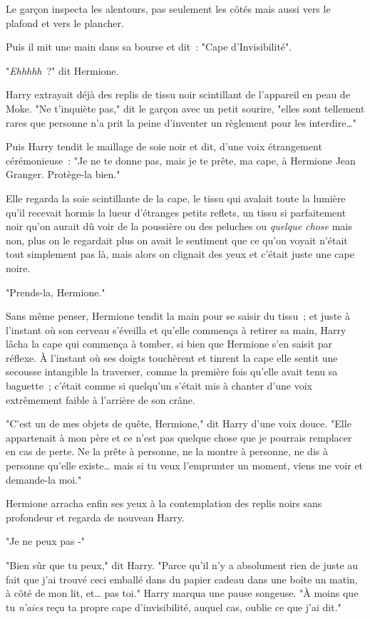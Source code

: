 Le garçon inspecta les alentours, pas seulement les côtés mais aussi vers le plafond et vers le plancher.

Puis il mit une main dans sa bourse et dit~: "Cape d'Invisibilité".

"\emph{Ehhhhh}~?" dit Hermione.

Harry extrayait déjà des replis de tissu noir scintillant de l'appareil en peau de Moke. "Ne t'inquiète pas," dit le garçon avec un petit sourire, "elles sont tellement rares que personne n'a prit la peine d'inventer un règlement pour les interdire…"

Puis Harry tendit le maillage de soie noir et dit, d'une voix étrangement cérémonieuse~: "Je ne te donne pas, mais je te prête, ma cape, à Hermione Jean Granger. Protège-la bien."

Elle regarda la soie scintillante de la cape, le tissu qui avalait toute la lumière qu'il recevait hormis la lueur d'étranges petits reflets, un tissu si parfaitement noir qu'on aurait dû voir de la poussière ou des peluches ou \emph{quelque chose} mais non, plus on le regardait plus on avait le sentiment que ce qu'on voyait n'était tout simplement pas là, mais alors on clignait des yeux et c'était juste une cape noire.

"Prends-la, Hermione."

Sans même penser, Hermione tendit la main pour se saisir du tissu~; et juste à l'instant où son cerveau s'éveilla et qu'elle commença à retirer sa main, Harry lâcha la cape qui commença à tomber, si bien que Hermione s'en saisit par réflexe. À l'instant où ses doigts touchèrent et tinrent la cape elle sentit une secousse intangible la traverser, comme la première fois qu'elle avait tenu sa baguette~; c'était comme si quelqu'un s'était mis à chanter d'une voix extrêmement faible à l'arrière de son crâne.

"C'est un de mes objets de quête, Hermione," dit Harry d'une voix douce. "Elle appartenait à mon père et ce n'est pas quelque chose que je pourrais remplacer en cas de perte. Ne la prête à personne, ne la montre à personne, ne dis à personne qu'elle existe… mais si tu veux l'emprunter un moment, viens me voir et demande-la moi."

Hermione arracha enfin ses yeux à la contemplation des replis noirs sans profondeur et regarda de nouveau Harry.

"Je ne peux pas -"

"Bien sûr que tu peux," dit Harry. "Parce qu'il n'y a absolument rien de juste au fait que j'ai trouvé ceci emballé dans du papier cadeau dans une boîte un matin, à côté de mon lit, et… pas toi." Harry marqua une pause songeuse. "À moins que tu \emph{n'aies} reçu ta propre cape d'invisibilité, auquel cas, oublie ce que j'ai dit."

